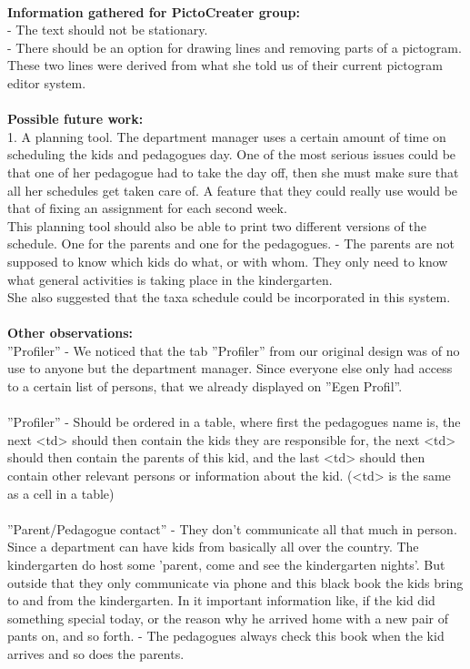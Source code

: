 \\
\textbf{Information gathered for PictoCreater group:}\\
- The text should not be stationary.\\
- There should be an option for drawing lines and removing parts of a pictogram.\\
These two lines were derived from what she told us of their current pictogram editor system.\\
\\
\textbf{Possible future work:}\\
1. A planning tool. The department manager uses a certain amount of time on scheduling the kids and pedagogues day. One of the most serious issues could be that one of her pedagogue had to take the day off, then she must make sure that all her schedules get taken care of. A feature that they could really use would be that of fixing an assignment for each second week.\\
This planning tool should also be able to print two different versions of the schedule. One for the parents and one for the pedagogues. - The parents are not supposed to know which kids do what, or with whom. They only need to know what general activities is taking place in the kindergarten.\\
She also suggested that the taxa schedule could be incorporated in this system.\\
\\
\textbf{Other observations:}\\
''Profiler'' - We noticed that the tab ''Profiler'' from our original design was of no use to anyone but the department manager. Since everyone else only had access to a certain list of persons, that we already displayed on ''Egen Profil''.\\
\\
''Profiler'' - Should be ordered in a table, where first the pedagogues name is, the next <td> should then contain the kids they are responsible for, the next <td> should then contain the parents of this kid, and the last <td> should then contain other relevant persons or information about the kid. (<td> is the same as a cell in a table)\\
\\
''Parent/Pedagogue contact'' - They don't communicate all that much in person. Since a department can have kids from basically all over the country. The kindergarten do host some 'parent, come and see the kindergarten nights'. But outside that they only communicate via phone and this black book the kids bring to and from the kindergarten. In it important information like, if the kid did something special today, or the reason why he arrived home with a new pair of pants on, and so forth. - The pedagogues always check this book when the kid arrives and so does the parents.\\
